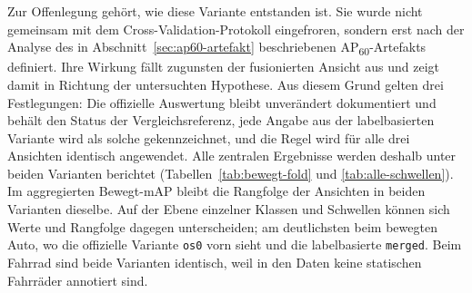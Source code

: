 Zur Offenlegung gehört, wie diese Variante entstanden ist. Sie wurde nicht gemeinsam mit dem Cross-Validation-Protokoll eingefroren, sondern erst nach der Analyse des in Abschnitt~\ref{sec:ap60-artefakt} beschriebenen AP\textsubscript{60}-Artefakts definiert. Ihre Wirkung fällt zugunsten der fusionierten Ansicht aus und zeigt damit in Richtung der untersuchten Hypothese. Aus diesem Grund gelten drei Festlegungen: Die offizielle Auswertung bleibt unverändert dokumentiert und behält den Status der Vergleichsreferenz, jede Angabe aus der labelbasierten Variante wird als solche gekennzeichnet, und die Regel wird für alle drei Ansichten identisch angewendet. Alle zentralen Ergebnisse werden deshalb unter beiden Varianten berichtet (Tabellen~\ref{tab:bewegt-fold} und \ref{tab:alle-schwellen}). Im aggregierten Bewegt-mAP bleibt die Rangfolge der Ansichten in beiden Varianten dieselbe. Auf der Ebene einzelner Klassen und Schwellen können sich Werte und Rangfolge dagegen unterscheiden; am deutlichsten beim bewegten Auto, wo die offizielle Variante \texttt{os0} vorn sieht und die labelbasierte \texttt{merged}. Beim Fahrrad sind beide Varianten identisch, weil in den Daten keine statischen Fahrräder annotiert sind.
